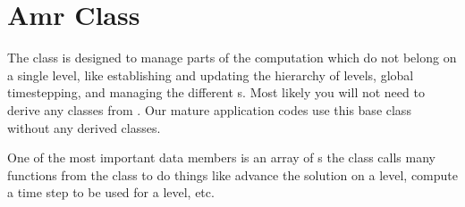 \documentclass[letterpaper,10pt,english]{sphinxmanual}
\begin{document}
\section{Amr Class}
\label{\detokenize{AmrLevel:amr-class}}\label{\detokenize{AmrLevel::doc}}
\sphinxAtStartPar
The  class is designed to manage parts of the computation which do
not belong on a single level, like establishing and updating the hierarchy of
levels, global timestepping, and managing the different s.
Most likely you will not need to derive any classes from . Our
mature application codes use this base class without any derived classes.

\sphinxAtStartPar
One of the most important data members is an array of s \sphinxhyphen{} the
 class calls many functions from the  class to do
things like advance the solution on a level, compute a time step to be used for
a level, etc.
\end{document}
